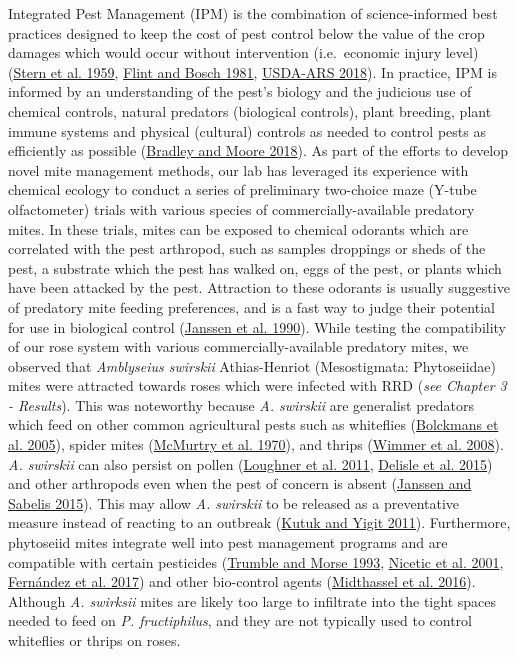 \documentclass{ufdissertation}[overrideChapters] %
\begin{document}
{Integrated Pest Management (IPM) is the combination of science-informed best practices designed to keep the cost of pest control below the value of the crop damages which would occur without intervention (i.e.~economic injury level) (\protect\hyperlink{ref-Stern1959}{Stern et al. 1959}, \protect\hyperlink{ref-Flint1981}{Flint and Bosch 1981}, \protect\hyperlink{ref-USDA2018}{USDA-ARS 2018}). In practice, IPM is informed by an understanding of the pest's biology and the judicious use of chemical controls, natural predators (biological controls), plant breeding, plant immune systems and physical (cultural) controls as needed to control pests as efficiently as possible (\protect\hyperlink{ref-Bradley2018}{Bradley and Moore 2018}). As part of the efforts to develop novel mite management methods, our lab has leveraged its experience with chemical ecology to conduct a series of preliminary two-choice maze (Y-tube olfactometer) trials with various species of commercially-available predatory mites. In these trials, mites can be exposed to chemical odorants which are correlated with the pest arthropod, such as samples droppings or sheds of the pest, a substrate which the pest has walked on, eggs of the pest, or plants which have been attacked by the pest. Attraction to these odorants is usually suggestive of predatory mite feeding preferences, and is a fast way to judge their potential for use in biological control (\protect\hyperlink{ref-Janssen1990}{Janssen et al. 1990}). While testing the compatibility of our rose system with various commercially-available predatory mites, we observed that \emph{Amblyseius swirskii} Athias-Henriot (Mesostigmata: Phytoseiidae) mites were attracted towards roses which were infected with RRD (\emph{see Chapter 3 - Results}). This was noteworthy because \emph{A. swirskii} are generalist predators which feed on other common agricultural pests such as whiteflies (\protect\hyperlink{ref-Bolckmans2005}{Bolckmans et al. 2005}), spider mites (\protect\hyperlink{ref-McMurtry1970}{McMurtry et al. 1970}), and thrips (\protect\hyperlink{ref-Wimmer2008}{Wimmer et al. 2008}). \emph{A. swirskii} can also persist on pollen (\protect\hyperlink{ref-Loughner2011}{Loughner et al. 2011}, \protect\hyperlink{ref-Delisle2015}{Delisle et al. 2015}) and other arthropods even when the pest of concern is absent (\protect\hyperlink{ref-Janssen2015}{Janssen and Sabelis 2015}). This may allow \emph{A. swirskii} to be released as a preventative measure instead of reacting to an outbreak (\protect\hyperlink{ref-Kutuk2011}{Kutuk and Yigit 2011}). Furthermore, phytoseiid mites integrate well into pest management programs and are compatible with certain pesticides (\protect\hyperlink{ref-Trumble1993}{Trumble and Morse 1993}, \protect\hyperlink{ref-Nicetic2001}{Nicetic et al. 2001}, \protect\hyperlink{ref-Fernandez2017}{Fernández et al. 2017}) and other bio-control agents (\protect\hyperlink{ref-Midthassel2016}{Midthassel et al. 2016}). Although \emph{A. swirksii} mites are likely too large to infiltrate into the tight spaces needed to feed on \emph{P. fructiphilus}, and they are not typically used to control whiteflies or thrips on roses.

}
\end{document}

